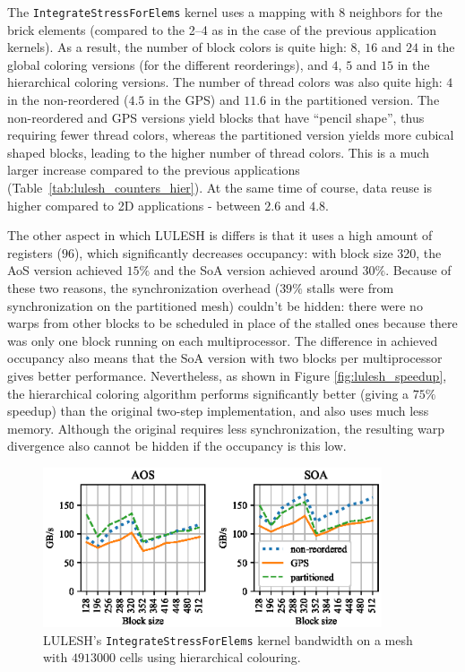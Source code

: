 The \texttt{IntegrateStressForElems} kernel uses a mapping with 8 neighbors for 
the brick elements (compared to the 2--4 as in the case of the previous 
application kernels). As a result, the number of block colors is quite high: $8$, $16$ 
and $24$ in the global coloring versions (for the different reorderings), and 
$4$, $5$ and $15$ in the hierarchical coloring versions. The number of thread 
colors was also quite high: $4$ in the non-reordered ($4.5$ in the GPS) and 
$11.6$ in the partitioned version. The non-reordered and GPS versions yield 
blocks that have ``pencil shape'', thus requiring fewer thread colors, whereas 
the partitioned version yields more cubical shaped blocks, leading to the higher 
number of thread colors. This is a much larger increase compared to the previous 
applications (Table~\ref{tab:lulesh_counters_hier}). At the same time of course, 
data reuse is higher compared to 2D applications - between $2.6$ and $4.8$.

The other aspect in which LULESH is differs is that it uses a high amount of
registers ($96$), which significantly decreases occupancy: with block size 320, 
the AoS version achieved $15\%$ and the SoA version achieved around $30\%$. 
Because of these two reasons, the synchronization overhead ($39\%$ stalls were 
from synchronization on the partitioned mesh) couldn't be hidden: there were no 
warps from other blocks to be scheduled in place of the stalled ones because
there was only one block running on each multiprocessor. The difference in 
achieved occupancy also means that the SoA version with two blocks 
per multiprocessor gives better performance. Nevertheless, as shown in Figure 
\ref{fig:lulesh_speedup}, the hierarchical coloring algorithm performs 
significantly better (giving a $75\%$ speedup) than the original two-step 
implementation, and also uses much less memory. Although the original requires 
less synchronization, the resulting warp divergence also cannot be hidden if the 
occupancy is this low.
 
\begin{figure}[Htbp]
\centering
\includegraphics[width=10cm]{fig/lulesh_bw-vs-bs_hier.eps}
\caption{LULESH's \texttt{IntegrateStressForElems} kernel bandwidth on a mesh 
with $4913000$ cells using hierarchical colouring.}
  \label{fig:lulesh_bw-vs-bs_hier}
\end{figure}

